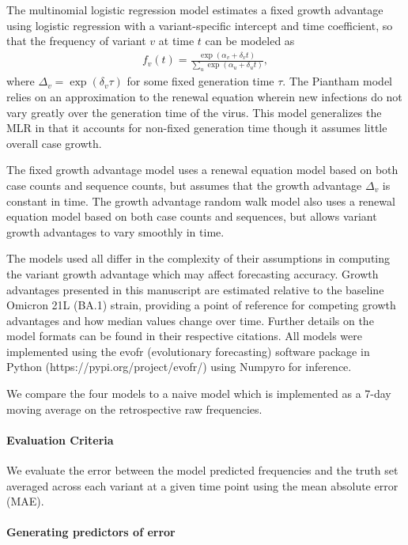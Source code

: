 \documentclass[11pt,oneside,letterpaper]{article}
\begin{document}
The multinomial logistic regression model estimates a fixed growth advantage using logistic regression with a variant-specific intercept and time coefficient, so that the frequency of variant $v$ at time $t$ can be modeled as
\begin{align*}
    f_{v}(t) = \frac{\exp(\alpha_{v} + \delta_{v} t)}{\sum_{u} \exp(\alpha_{u} + \delta_{u} t)},
\end{align*}
where $\Delta_{v} = \exp(\delta_{v} \tau)$ for some fixed generation time $\tau$.
The Piantham model relies on an approximation to the renewal equation wherein new infections do not vary greatly over the generation time of the virus.
This model generalizes the MLR in that it accounts for non-fixed generation time though it assumes little overall case growth. \cite{piantham2021estimating}

The fixed growth advantage model uses a renewal equation model based on both case counts and sequence counts, but assumes that the growth advantage $\Delta_{v}$ is constant in time. \cite{figgins2022sars}
The growth advantage random walk model also uses a renewal equation model based on both case counts and sequences, but allows variant growth advantages to vary smoothly in time. \cite{figgins2022sars}

The models used all differ in the complexity of their assumptions in computing the variant growth advantage which may affect forecasting accuracy.
Growth advantages presented in this manuscript are estimated relative to the baseline Omicron 21L (BA.1) strain, providing a point of reference for competing growth advantages and how median values change over time.
Further details on the model formats can be found in their respective citations.
All models were implemented using the evofr (evolutionary forecasting) software package in Python (https://pypi.org/project/evofr/) using Numpyro for inference.

We compare the four models to a naive model which is implemented as a 7-day moving average on the retrospective raw frequencies.

\paragraph{Evaluation Criteria}

We evaluate the error between the model predicted frequencies and the truth set averaged across each variant at a given time point using the mean absolute error (MAE).

\paragraph{Generating predictors of error}
\end{document}
